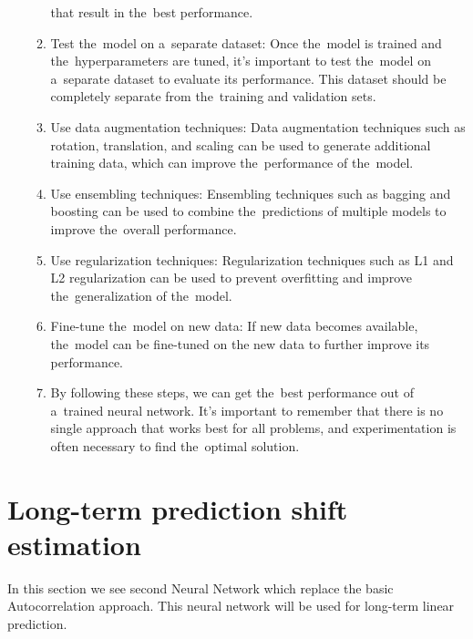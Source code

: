 \begin{enumerate}
\begin{enumerate}[label=\alph*]
                that result in the~best performance.
                \item Test the~model on a~separate dataset: Once the~model is trained and the~hyperparameters are tuned,
                it's important to test the~model on a~separate dataset to evaluate its performance. This dataset should be
                completely separate from the~training and validation sets.
                \item Use data augmentation techniques: Data augmentation techniques such as rotation, translation, and
                scaling can be used to generate additional training data, which can improve the~performance of the~model.
                \item Use ensembling techniques: Ensembling techniques such as bagging and boosting can be used to
                combine the~predictions of multiple models to improve the~overall performance.
                \item Use regularization techniques: Regularization techniques such as L1 and L2 regularization
                can be used to prevent overfitting and improve the~generalization of the~model.
                \item Fine-tune the~model on new data: If new data becomes available, the~model can be fine-tuned on the
                new data to further improve its performance.
                \item By following these steps, we can get the~best performance out of a~trained neural network.
                It's important to remember that there is no single approach that works best for all problems, and
                experimentation is often necessary to find the~optimal solution.
            \end{enumerate}
        \end{enumerate}
    
    \section{Long-term prediction shift estimation}\label{sec:shiftcalc}
    In this section we see second Neural Network which replace the basic Autocorrelation approach.
    This neural network will be used for long-term linear prediction.
